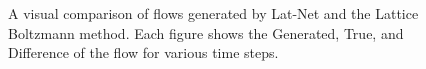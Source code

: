 \documentclass{article}
\begin{document}
\begin{figure}[!t]
\caption{A visual comparison of flows generated by Lat-Net and the Lattice Boltzmann method. Each figure shows the Generated, True, and Difference of the flow for various time steps.}
\label{2d_image_plot}
\end{figure}
\end{document}
